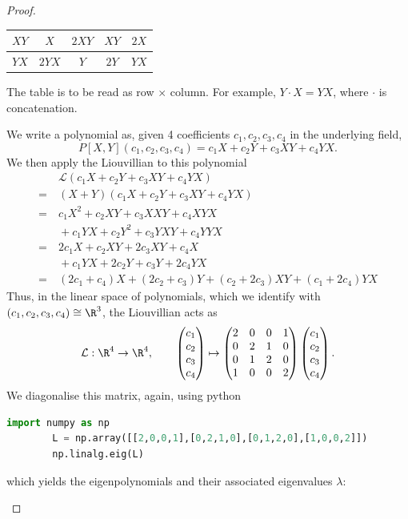 \begin{proof}
\begin{parts}
\begin{center}
\begin{tabular}{c|c|c|c|c|}
\hline
$XY$ & $X$ & $2XY$ & $XY$ & $2X$ \\ 
\hline
$YX$ & $2YX$ & $Y$ & $2Y$ & $YX$ \\ 
\hline
\end{tabular}
\end{center}
The table is to be read as row $\times$ column. For example, $Y\cdot X = YX$, where $\cdot$ is concatenation.
\item We write a polynomial as, given 4 coefficients $c_1,c_2,c_3,c_4$ in the underlying field,
	\[
		P[X,Y](c_1,c_2,c_3,c_4) = c_1 X + c_2 Y + c_3 XY + c_4 YX
	.\] 
	We then apply the Liouvillian to this polynomial
	\begin{align*}
		&~\mathcal{L}(c_1 X + c_2 Y + c_3 XY + c_4 YX)\\
		=&~(X+Y)(c_1 X + c_2 Y + c_3 XY + c_4 YX)\\
		=&~c_1 X^2 + c_2 XY + c_3 XXY + c_4 XYX\\
		 &~+ c_1 YX + c_2 Y^2 + c_3 YXY + c_4 YYX\\
		=&~2c_1 X + c_2 XY + 2c_3 XY + c_4 X\\
		 &~+ c_1 YX + 2 c_2 Y + c_3 Y + 2c_4 YX\\
		=&~(2c_1+c_4)X + (2c_2+c_3)Y + (c_2+2c_3)XY + (c_1+2c_4)YX
	\end{align*}
	Thus, in the linear space of polynomials, which we identify with $(c_1,c_2,c_3,c_4)\cong \R^3$, the Liouvillian acts as
	\[
		\mathcal{L}:\R^4 \to \R^4,\qquad \begin{pmatrix} c_1 \\ c_2 \\ c_3 \\c_4 \end{pmatrix} \mapsto \begin{pmatrix} 2 & 0 & 0 & 1\\
	0 & 2 & 1 & 0 \\
0 & 1 & 2 & 0 \\
1 & 0 & 0 & 2\end{pmatrix} \begin{pmatrix} c_1 \\ c_2 \\ c_3 \\ c_4 \end{pmatrix} 
	.\] 
		We diagonalise this matrix, again, using python
	\begin{lstlisting}[language=Python]
		import numpy as np
		L = np.array([[2,0,0,1],[0,2,1,0],[0,1,2,0],[1,0,0,2]])
		np.linalg.eig(L)\end{lstlisting}
	which yields the eigenpolynomials and their associated eigenvalues $\lambda$:

\end{parts}
\end{proof}
